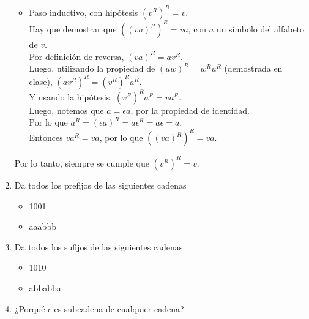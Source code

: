 \documentclass{article}
\begin{document}
\begin{enumerate}
{\begin{itemize}
{\begin{itemize}
                    \item {
                        Paso inductivo, con hipótesis $(v^R)^R = v$.\\
                        Hay que demostrar que $((va)^R)^R = va$, con $a$ un 
                        símbolo del alfabeto de $v$.\\
                        Por definición de reversa, $(va)^R = av^R$.\\
                        Luego, utilizando la propiedad de $(uw)^R = w^Ru^R$ 
                        (demostrada en clase), $(av^R)^R = (v^R)^Ra^R$.\\
                        Y usando la hipótesis, $(v^R)^Ra^R = va^R$.\\
                        Luego, notemos que $a = \epsilon a$, por la propiedad 
                        de identidad.\\
                        Por lo que $a^R = (\epsilon a)^R = 
                        a  \epsilon^R = a \epsilon = a$.\\
                        Entonces $va^R = va$, por lo que $((va)^R)^R = va$.
                    }
                \end{itemize}
                Por lo tanto, siempre se cumple que $(v^R)^R = v$.
            }
        \end{itemize}
    }

    \item {
        Da todos los prefijos de las siguientes cadenas

        \begin{itemize}
            \item {
                1001
            }

            \item {
                aaabbb
            }
        \end{itemize}
    }

    \item {
        Da todos los sufijos de las siguientes cadenas

        \begin{itemize}
            \item {
                1010
            }

            \item {
                abbabba
            }
        \end{itemize}
    }

    \item {
        ¿Porqué $\epsilon$ es subcadena de cualquier cadena?
    }

\end{enumerate}
    
\end{document}

